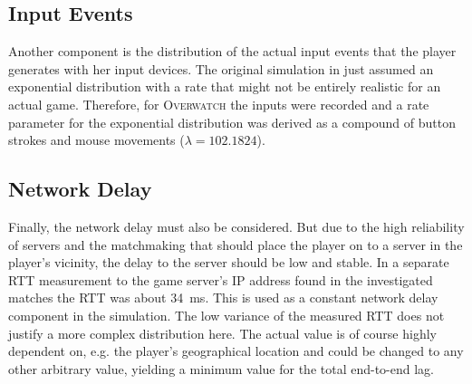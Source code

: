 \subsection{Input Events}

	Another component is the distribution of the actual input events that the player generates with her input devices. The original simulation in \cite{Metzger+2016} just assumed an exponential distribution with a rate that might not be entirely realistic for an actual game. Therefore, for \textsc{Overwatch} the inputs were recorded and a rate parameter for the exponential distribution was derived as a compound of button strokes and mouse movements ($\lambda = 102.1824$).


\subsection{Network Delay}

	Finally, the network delay must also be considered. But due to the high reliability of servers and the matchmaking that should place the player on to a server in the player's vicinity, the delay to the server should be low and stable. In a separate RTT measurement to the game server's IP address found in the investigated matches the RTT was about \SI{34}{\milli\second}. This is used as a constant network delay component in the simulation. The low variance of the measured RTT does not justify a more complex distribution here. The actual value is of course highly dependent on, e.g. the player's geographical location and could be changed to any other arbitrary value, yielding a minimum value for the total end-to-end lag.


